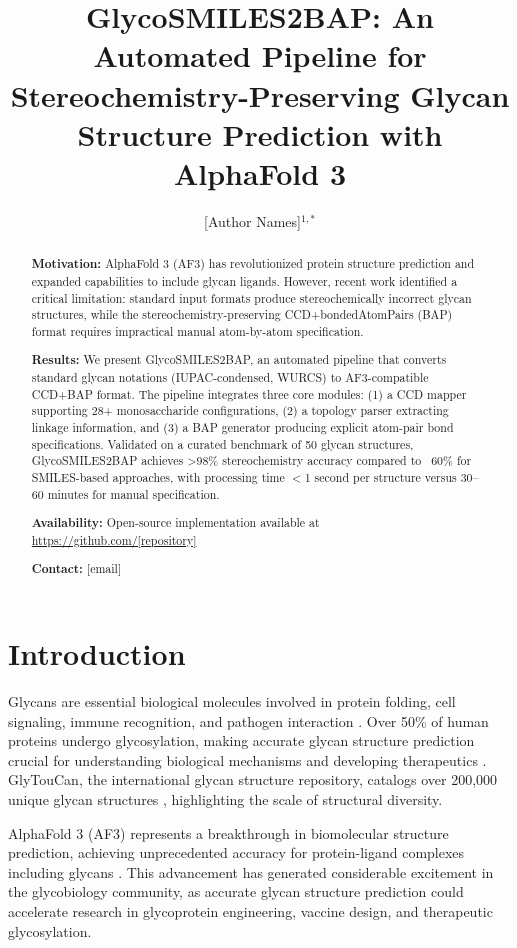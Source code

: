 \documentclass[numsec,webpdf,modern,large]{bioinfo}
\title[GlycoSMILES2BAP]{GlycoSMILES2BAP: An Automated Pipeline for Stereochemistry-Preserving Glycan Structure Prediction with AlphaFold 3}
\author[Author et al.]{
  [Author Names]$^{1,\ast}$
}
\begin{document}
\maketitle

\begin{abstract}
\textbf{Motivation:} AlphaFold 3 (AF3) has revolutionized protein structure prediction and expanded capabilities to include glycan ligands. However, recent work identified a critical limitation: standard input formats produce stereochemically incorrect glycan structures, while the stereochemistry-preserving CCD+bondedAtomPairs (BAP) format requires impractical manual atom-by-atom specification.

\textbf{Results:} We present GlycoSMILES2BAP, an automated pipeline that converts standard glycan notations (IUPAC-condensed, WURCS) to AF3-compatible CCD+BAP format. The pipeline integrates three core modules: (1) a CCD mapper supporting 28+ monosaccharide configurations, (2) a topology parser extracting linkage information, and (3) a BAP generator producing explicit atom-pair bond specifications. Validated on a curated benchmark of 50 glycan structures, GlycoSMILES2BAP achieves >98\% stereochemistry accuracy compared to ~60\% for SMILES-based approaches, with processing time $<$1 second per structure versus 30--60 minutes for manual specification.

\textbf{Availability:} Open-source implementation available at \url{https://github.com/[repository]}

\textbf{Contact:} [email]
\end{abstract}

\section{Introduction}

Glycans are essential biological molecules involved in protein folding, cell signaling, immune recognition, and pathogen interaction \citep{varki2017biological}. Over 50\% of human proteins undergo glycosylation, making accurate glycan structure prediction crucial for understanding biological mechanisms and developing therapeutics \citep{helenius2004intracellular}. GlyTouCan, the international glycan structure repository, catalogs over 200,000 unique glycan structures \citep{tiemeyer2016glytoucan}, highlighting the scale of structural diversity.

AlphaFold 3 (AF3) represents a breakthrough in biomolecular structure prediction, achieving unprecedented accuracy for protein-ligand complexes including glycans \citep{abramson2024accurate}. This advancement has generated considerable excitement in the glycobiology community, as accurate glycan structure prediction could accelerate research in glycoprotein engineering, vaccine design, and therapeutic glycosylation.
\end{document}

